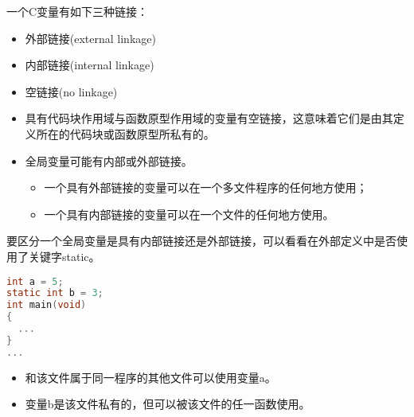 \begin{frame}[fragile]
一个C变量有如下三种链接：\vspace{0.05in}
\begin{itemize}
\item 外部链接{\tf (external linkage)} \\[0.1in]
\item 内部链接{\tf (internal linkage)} \\[0.1in]
\item 空链接{\tf (no linkage)}
\end{itemize}
\end{frame}


\begin{frame}[fragile]
  \begin{itemize}
  \item 具有\textcolor{acolor1}{代码块作用域与函数原型作用域}的变量有\textcolor{acolor3}{空链接}，这意味着它们是由其定义所在的代码块或函数原型所私有的。\\[0.1in]
  \item 全局变量可能有内部或外部链接。\\[0.1in]
    \begin{itemize}
    \item 一个具有外部链接的变量可以在一个多文件程序的任何地方使用；\\[0.1in]
    \item 一个具有内部链接的变量可以在一个文件的任何地方使用。
    \end{itemize}
    
  \end{itemize}
\end{frame}

\begin{frame}[fragile]
  要区分一个全局变量是具有内部链接还是外部链接，可以看看在外部定义中是否使用了关键字{\tf static}。
  \begin{lstlisting}[language=c,frame=single]
int a = 5;
static int b = 3;
int main(void)
{
  ...
}    
...
  \end{lstlisting}
  \begin{itemize}
  \item 和该文件属于同一程序的其他文件可以使用变量{\tf a}。
  \item 变量{\tf b}是该文件私有的，但可以被该文件的任一函数使用。
  \end{itemize}
\end{frame}

